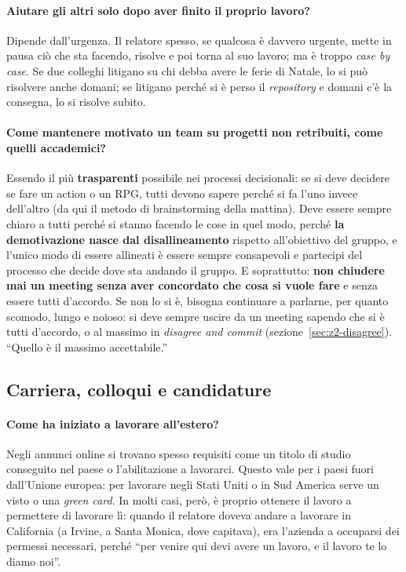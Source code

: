\paragraph{Aiutare gli altri solo dopo aver finito il proprio lavoro?} Dipende dall'urgenza. Il relatore spesso,
se qualcosa è davvero urgente, mette in pausa ciò che sta facendo, risolve e poi torna al suo lavoro; ma è troppo
\emph{case by case}. Se due colleghi litigano su chi debba avere le ferie di Natale, lo si può risolvere anche
domani; se litigano perché si è perso il \emph{repository} e domani c'è la consegna, lo si risolve subito.

\paragraph{Come mantenere motivato un team su progetti non retribuiti, come quelli accademici?} Essendo il più
\textbf{trasparenti} possibile nei processi decisionali: se si deve decidere se fare un action o un RPG, tutti
devono sapere perché si fa l'uno invece dell'altro (da qui il metodo di brainstorming della mattina). Deve essere
sempre chiaro a tutti perché si stanno facendo le cose in quel modo, perché \textbf{la demotivazione nasce dal
disallineamento} rispetto all'obiettivo del gruppo, e l'unico modo di essere allineati è essere sempre
consapevoli e partecipi del processo che decide dove sta andando il gruppo. E soprattutto: \textbf{non chiudere
mai un meeting senza aver concordato che cosa si vuole fare} e senza essere tutti d'accordo. Se non lo si è,
bisogna continuare a parlarne, per quanto scomodo, lungo e noioso: si deve sempre uscire da un meeting
sapendo che si è tutti d'accordo, o al massimo in \emph{disagree and commit} (sezione~\ref{sec:z2-disagree}).
``Quello è il massimo accettabile.''

\subsection{Carriera, colloqui e candidature}

\paragraph{Come ha iniziato a lavorare all'estero?} Negli annunci online si trovano spesso requisiti come un titolo
di studio conseguito nel paese o l'abilitazione a lavorarci. Questo vale per i paesi fuori dall'Unione europea: per
lavorare negli Stati Uniti o in Sud America serve un visto o una \emph{green card}. In molti casi, però, è proprio
ottenere il lavoro a permettere di lavorare lì: quando il relatore doveva andare a lavorare in California (a Irvine,
a Santa Monica, dove capitava), era l'azienda a occuparsi dei permessi necessari, perché ``per venire qui devi avere
un lavoro, e il lavoro te lo diamo noi''.


